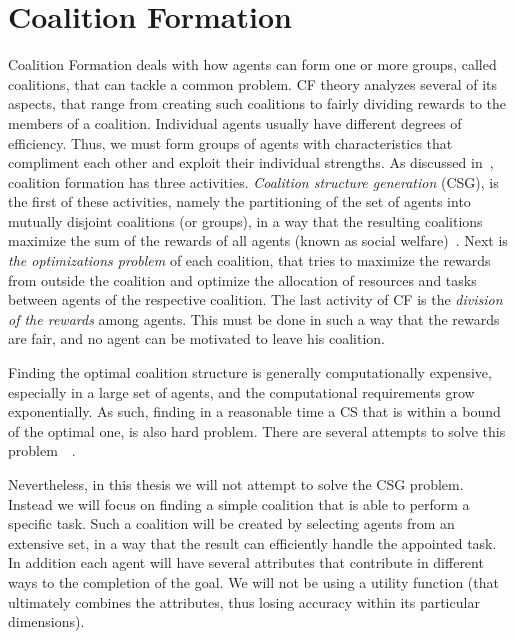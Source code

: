 
\section{Coalition Formation} %

\label{Chapter3_cf} %

Coalition Formation deals with how agents can form one or more groups, called coalitions, that can tackle a common problem. CF theory analyzes several of its aspects, that range from creating such coalitions to fairly dividing rewards to the members of a coalition.  
Individual agents usually have different degrees of efficiency. Thus, we must form groups of agents with characteristics that compliment each other and exploit their individual strengths\cite{shehory1998methods}.
As discussed in~\cite{sandholm1999coalition}, coalition formation has three activities. {\em Coalition structure generation} (CSG), is the first of these activities, namely the partitioning of the set of agents into mutually disjoint coalitions (or groups), in a way that the resulting coalitions maximize the sum of the rewards of all agents (known as social welfare)~\cite{rahwan2009anytime}. Next is {\em the optimizations problem} of each coalition, that tries to maximize the rewards from outside the coalition and optimize the allocation of resources and tasks between agents of the respective coalition. The last activity of CF is the {\em division of the rewards} among agents. This must be done in such a way that the rewards are fair, and no agent can be motivated to leave his coalition.

Finding the optimal coalition structure is generally computationally expensive, especially in a large set of agents, and the computational requirements grow exponentially. As such, finding in a reasonable time a CS that is within a bound of the optimal one, is also hard problem. There are several attempts to solve this problem~\cite{sandholm1999coalition}~\cite{rahwan2009anytime}.

Nevertheless, in this thesis we will not attempt to solve the CSG problem. Instead we will focus on finding a simple coalition that is able to perform a specific task. Such a coalition will be created by selecting agents from an extensive set, in a way that the result can efficiently handle the appointed task. In addition each agent will have several attributes that contribute in different ways to the completion of the goal. We will not be using a utility function (that ultimately combines the attributes, thus losing accuracy within its particular dimensions). 

